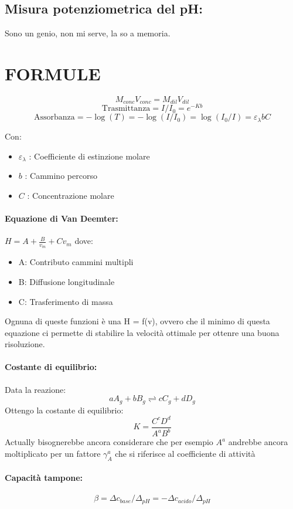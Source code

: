 \documentclass{article}
\begin{document}
\hrulefill

\subsection{Misura potenziometrica del pH:} Sono un genio, non mi serve, la so a memoria.

\newpage

\section{FORMULE}
$$M_{conc}V_{conc} = M_{dil}V_{dil}$$
\hrulefill
$$\text{Trasmittanza} = I/I_0 = e^{-Kb}$$
$$\text{Assorbanza} = -\log{(T)} = -\log{(I/I_0)} = \log{(I_0/I)} = \varepsilon_{\lambda}bC$$

Con:
\begin{itemize}
	\item $\varepsilon_{\lambda}$ : Coefficiente di estinzione molare
	\item $b$ : Cammino percorso
	\item $C$ : Concentrazione molare
\end{itemize}
\hrulefill

\paragraph{Equazione di Van Deemter: } $H=A+\frac{B}{v_m}+Cv_m$ dove:
\begin{itemize}
	\item A: Contributo cammini multipli
	\item B: Diffusione longitudinale
	\item C: Trasferimento di massa
\end{itemize}
%
Ognuna di queste funzioni è una H = f(v), ovvero che il minimo di questa equazione ci permette di stabilire la velocità ottimale per ottenre una buona risoluzione.

\hrulefill

\paragraph{Costante di equilibrio: } Data la reazione: $$aA_{g} + bB_{g} \rightleftharpoons cC_{g} + dD_{g}$$ Ottengo la costante di equilibrio:
$$K = \frac{C^cD^d}{A^aB^b}$$ Actually bisognerebbe ancora considerare che per esempio $A^a$ andrebbe ancora moltiplicato per un fattore $\gamma_A^a$ che si riferisce al coefficiente di attività

\paragraph{Capacità tampone: } $$\beta = \Delta c_{base} / \Delta_{pH} = - \Delta c_{acido} / \Delta_{pH}$$
\end{document}
